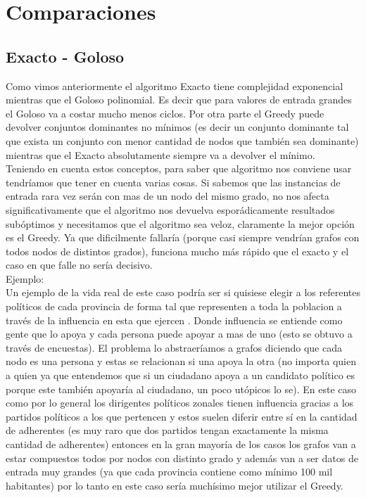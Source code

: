 \section{Comparaciones}

\subsection{Exacto - Goloso}

Como vimos anteriormente el algoritmo Exacto tiene complejidad exponencial mientras que el Goloso polinomial. Es decir que para valores de entrada grandes el Goloso va a costar mucho menos ciclos. Por otra parte el Greedy puede devolver conjuntos dominantes no mínimos (es decir un conjunto dominante tal que exista un conjunto con menor cantidad de nodos que también sea dominante) mientras que el Exacto absolutamente siempre va a devolver el mínimo. \\
Teniendo en cuenta estos conceptos, para saber que algoritmo nos conviene usar tendríamos que tener en cuenta varias cosas. Si sabemos que las instancias de entrada rara vez serán con mas de un nodo del mismo grado, no nos afecta significativamente que el algoritmo nos devuelva esporádicamente resultados subóptimos y necesitamos que el algoritmo sea veloz, claramente la mejor opción es el Greedy. Ya que dificilmente fallaría (porque casi siempre vendrían grafos con todos nodos de distintos grados), funciona mucho más rápido que el exacto y el caso en que falle no sería decisivo. \\
Ejemplo:\\
Un ejemplo de la vida real de este caso podría ser si quisiese elegir a los referentes políticos de cada provincia de forma tal que representen a toda la poblacion a través de la influencia en esta que ejercen . Donde influencia se entiende como gente que lo apoya y cada persona puede apoyar a mas de uno (esto se obtuvo a través de encuestas). El problema lo abstraeríamos a grafos diciendo que cada nodo es una persona y estas se relacionan si una apoya la otra (no importa quien a quien ya que entendemos que si un ciudadano apoya a un candidato político es porque este también apoyaría al ciudadano, un poco utópicos lo se). En este caso como por lo general los dirigentes políticos zonales tienen influencia gracias a los partidos políticos a los que pertencen y estos suelen diferir entre sí en la cantidad de adherentes (es muy raro que dos partidos tengan exactamente la misma cantidad de adherentes) entonces en la gran mayoría de los casos los grafos van a estar compuestos todos por nodos con distinto grado y además van a ser datos de entrada muy grandes (ya que cada provincia contiene como mínimo 100 mil habitantes) por lo tanto en este caso sería muchísimo mejor utilizar el Greedy. \\
